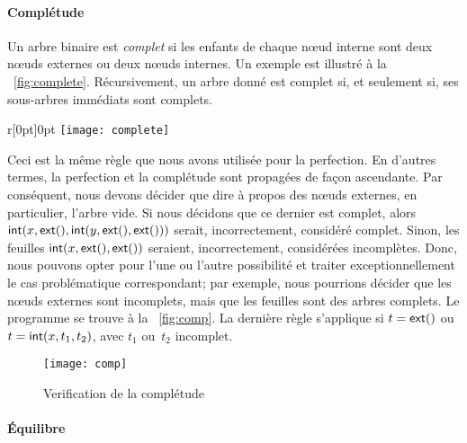 \paragraph{Complétude}

Un arbre binaire est \emph{complet} si les enfants de chaque n{\oe}ud interne sont deux
n{\oe}uds externes ou deux n{\oe}uds internes. Un exemple est illustré
à la \fig~\ref{fig:complete}. Récursivement, un arbre donné est
complet si, et seulement si, ses sous-arbres immédiats sont complets.
%
\begin{wrapfigure}[7]{r}[0pt]{0pt}
\centering
\texttt{[image: complete]}
\caption{\label{fig:complete}}
\end{wrapfigure}
Ceci est la même règle que nous avons utilisée pour la perfection. En
d'autres termes, la perfection et la complétude sont propagées de
façon ascendante. Par conséquent, nous devons décider que dire à
propos des n{\oe}uds externes, en particulier, l'arbre vide. Si nous
décidons que ce dernier est complet, alors
\(\textsf{int}(x,\textsf{ext}(),\textsf{int}(y,\textsf{ext}(),\textsf{ext}()))\)
serait, incorrectement, considéré complet. Sinon, les
feuilles
\(\textsf{int}(x,\textsf{ext}(),\textsf{ext}())\) seraient, incorrectement,
considérées incomplètes. Donc, nous pouvons opter pour l'une ou
l'autre possibilité et traiter exceptionnellement le cas problématique
correspondant; par exemple, nous pourrions décider que les n{\oe}uds
externes sont incomplets, mais que les feuilles sont des arbres
complets. Le programme se trouve à la \fig~\vref{fig:comp}. La
dernière règle s'applique si \(t=\textsf{ext}()\) ou
\(t=\textsf{int}(x,t_1,t_2)\), avec \(t_1\) ou~\(t_2\) incomplet.

\bigskip

\begin{figure}[h]
\centering
\texttt{[image: comp]}
\caption{Verification de la complétude\label{fig:comp}}
\end{figure}

\paragraph{Équilibre}

